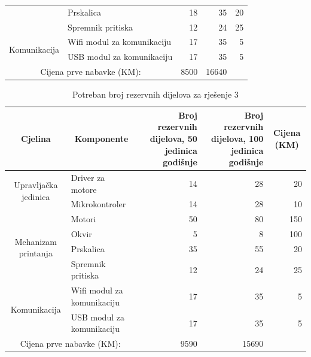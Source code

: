 \documentclass[12pt]{article}
\begin{document}
\begin{landscape}
\begin{table}[htbp]
\begin{tabular}{ccrrr}
          & \multicolumn{1}{l}{Prskalica} & 18    & 35    & 20 \\
          & \multicolumn{1}{l}{Spremnik pritiska} & 12    & 24    & 25 \\
    \midrule
    \multirow{2}[2]{*}{Komunikacija} & \multicolumn{1}{l}{Wifi modul za komunikaciju} & 17    & 35    & 5 \\
          & \multicolumn{1}{l}{USB modul za komunikaciju} & 17    & 35    & 5 \\
    \midrule
    \multicolumn{2}{c}{Cijena prve nabavke (KM):} & 8500  & 16640 &  \\
    \bottomrule
    \end{tabular}%
  \label{tab:rezerve1}%
\end{table}%

\begin{table}[htbp]
  \centering
  \caption{Potreban broj rezervnih dijelova za rješenje 3}
    \begin{tabular}{ccrrr}
    \toprule
    Cjelina & Komponente & \multicolumn{1}{p{7.93em}}{Broj rezervnih \newline{}dijelova, 50 \newline{}jedinica godišnje} & \multicolumn{1}{p{8.285em}}{Broj rezervnih \newline{}dijelova, 100 \newline{}jedinica godišnje} & \multicolumn{1}{c}{Cijena (KM)} \\
    \midrule
    \multirow{2}[2]{*}{Upravljačka jedinica} & \multicolumn{1}{l}{Driver za motore} & 14    & 28    & 20 \\
          & \multicolumn{1}{l}{Mikrokontroler} & 14    & 28    & 10 \\
    \midrule
    \multirow{4}[2]{*}{Mehanizam printanja} & \multicolumn{1}{l}{Motori} & 50    & 80    & 150 \\
          & \multicolumn{1}{l}{Okvir} & 5     & 8     & 100 \\
          & \multicolumn{1}{l}{Prskalica} & 35    & 55    & 20 \\
          & \multicolumn{1}{l}{Spremnik pritiska} & 12    & 24    & 25 \\
    \midrule
    \multirow{2}[2]{*}{Komunikacija} & \multicolumn{1}{l}{Wifi modul za komunikaciju} & 17    & 35    & 5 \\
          & \multicolumn{1}{l}{USB modul za komunikaciju} & 17    & 35    & 5 \\
    \midrule
    \multicolumn{2}{c}{Cijena prve nabavke (KM):} & 9590  & 15690 &  \\
    \bottomrule
    \end{tabular}%
  \label{tab:rezerve2}%
\end{table}%

\end{landscape}
\end{document}
